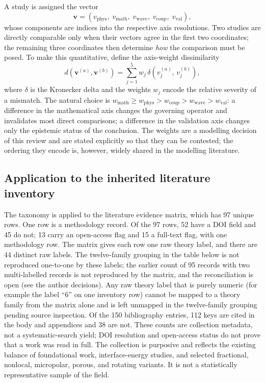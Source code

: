 A study is assigned the vector
\begin{equation}
\bm{v} = \left(v_{\text{phys}},\; v_{\text{math}},\; v_{\text{wave}},\; v_{\text{coup}},\; v_{\text{val}}\right),
\label{eq:14.1}
\end{equation}
whose components are indices into the respective axis resolutions. Two studies are directly comparable only when their vectors agree in the first two coordinates; the remaining three coordinates then determine \emph{how} the comparison must be posed. To make this quantitative, define the axis-weight dissimilarity
\begin{equation}
d(\bm{v}^{(a)},\bm{v}^{(b)}) = \sum_{j=1}^{5} w_j \,\delta\!\left(v^{(a)}_j,\, v^{(b)}_j\right),
\label{eq:14.2}
\end{equation}
where $\delta$ is the Kronecker delta and the weights $w_j$ encode the relative severity of a mismatch. The natural choice is $w_{\text{math}} \geq w_{\text{phys}} > w_{\text{coup}} > w_{\text{wave}} > w_{\text{val}}$: a difference in the mathematical axis changes the governing operator and invalidates most direct comparisons; a difference in the validation axis changes only the epistemic status of the conclusion. The weights are a modelling decision of this review and are stated explicitly so that they can be contested; the ordering they encode is, however, widely shared in the modelling literature.

\subsection{Application to the inherited literature inventory}
\label{sec:14.3}

The taxonomy is applied to the literature evidence matrix, which has 97 unique rows. One row is a methodology record. Of the 97 rows, 52 have a DOI field and 45 do not; 13 carry an open-access flag and 15 a full-text flag, with one methodology row. The matrix gives each row one raw theory label, and there are 44 distinct raw labels. The twelve-family grouping in the table below is not reproduced one-to-one by these labels; the earlier count of 95 records with two multi-labelled records is not reproduced by the matrix, and the reconciliation is open (see the author decisions). Any raw theory label that is purely numeric (for example the label “6” on one inventory row) cannot be mapped to a theory family from the matrix alone and is left unmapped in the twelve-family grouping pending source inspection. Of the 150 bibliography entries, 112 keys are cited in the body and appendices and 38 are not. These counts are collection metadata, not a systematic-search yield; DOI resolution and open-access status do not prove that a work was read in full. The collection is purposive and reflects the existing balance of foundational work, interface-energy studies, and selected fractional, nonlocal, micropolar, porous, and rotating variants. It is not a statistically representative sample of the field.

